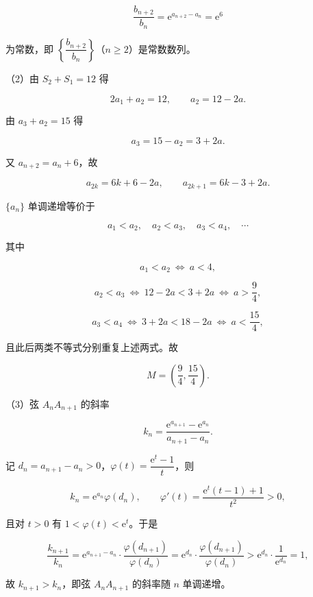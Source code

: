 \begin{answer}
\nopagebreak[4]
\[\frac{b_{n+2}}{b_n}=\mathrm e^{a_{n+2}-a_n}=\mathrm e^6\]

为常数，即 $\left\{\dfrac{b_{n+2}}{b_n}\right\}$（$n\geqslant2$）是常数数列。

（2）由 $S_2+S_1=12$ 得

\nopagebreak[4]
\[2a_1+a_2=12,\qquad a_2=12-2a.\]

由 $a_3+a_2=15$ 得

\nopagebreak[4]
\[a_3=15-a_2=3+2a.\]

又 $a_{n+2}=a_n+6$，故

\nopagebreak[4]
\[a_{2k}=6k+6-2a,\qquad a_{2k+1}=6k-3+2a.\]

$\{a_n\}$ 单调递增等价于

\nopagebreak[4]
\[a_1<a_2,\quad a_2<a_3,\quad a_3<a_4,\quad\cdots\]

其中

\nopagebreak[4]
\[a_1<a_2\ \Longleftrightarrow\ a<4,\]

\nopagebreak[4]
\[a_2<a_3\ \Longleftrightarrow\ 12-2a<3+2a\ \Longleftrightarrow\ a>\frac94,\]

\nopagebreak[4]
\[a_3<a_4\ \Longleftrightarrow\ 3+2a<18-2a\ \Longleftrightarrow\ a<\frac{15}4,\]

且此后两类不等式分别重复上述两式。故

\nopagebreak[4]
\[M=\left(\frac94,\frac{15}4\right).\]

（3）弦 $A_nA_{n+1}$ 的斜率

\nopagebreak[4]
\[k_n=\frac{\mathrm e^{a_{n+1}}-\mathrm e^{a_n}}{a_{n+1}-a_n}.\]

记 $d_n=a_{n+1}-a_n>0$，$\varphi(t)=\dfrac{\mathrm e^t-1}{t}$，则

\nopagebreak[4]
\[k_n=\mathrm e^{a_n}\varphi(d_n),\qquad \varphi'(t)=\frac{\mathrm e^t(t-1)+1}{t^2}>0,\]

且对 $t>0$ 有 $1<\varphi(t)<\mathrm e^t$。于是

\nopagebreak[4]
\[\frac{k_{n+1}}{k_n}=\mathrm e^{a_{n+1}-a_n}\cdot\frac{\varphi(d_{n+1})}{\varphi(d_n)}
=\mathrm e^{d_n}\cdot\frac{\varphi(d_{n+1})}{\varphi(d_n)}
>\mathrm e^{d_n}\cdot\frac1{\mathrm e^{d_n}}=1,\]

故 $k_{n+1}>k_n$，即弦 $A_nA_{n+1}$ 的斜率随 $n$ 单调递增。


\end{answer}